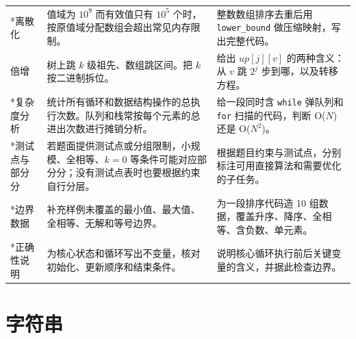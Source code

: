 \documentclass[a4paper,11pt]{article}
\newcommand{\code}[1]{\texttt{#1}}
\begin{document}
\begin{longtable}{L{2.4cm} L{7.5cm} L{6.8cm}}
*离散化
& 值域为 $10^9$ 而有效值只有 $10^5$ 个时，按原值域分配数组会超出常见内存限制。
& 整数数组排序去重后用 \code{lower\_bound} 做压缩映射，写出完整代码。 \\[2mm]

倍增
& 树上跳 $k$ 级祖先、数组跳区间。把 $k$ 按二进制拆位。
& 给出 $up[j][v]$ 的两种含义：从 $v$ 跳 $2^j$ 步到哪，以及转移方程。 \\[2mm]

*复杂度分析
& 统计所有循环和数据结构操作的总执行次数。队列和栈常按每个元素的总进出次数进行摊销分析。
& 给一段同时含 \code{while} 弹队列和 \code{for} 扫描的代码，判断 O($N$) 还是 O($N^2$)。 \\[2mm]

*测试点与部分分
& 若题面提供测试点或分组限制，小规模、全相等、$k=0$ 等条件可能对应部分分；没有测试点表时也要根据约束自行分层。
& 根据题目约束与测试点，分别标注可用直接算法和需要优化的子任务。 \\[2mm]

*边界数据
& 补充样例未覆盖的最小值、最大值、全相等、无解和等号边界。
& 为一段排序代码造 10 组数据，覆盖升序、降序、全相等、含负数、单元素。 \\[2mm]

*正确性说明
& 为核心状态和循环写出不变量，核对初始化、更新顺序和结束条件。
& 说明核心循环执行前后关键变量的含义，并据此检查边界。 \\
\end{longtable}

\newpage
\section{字符串}
\end{document}

